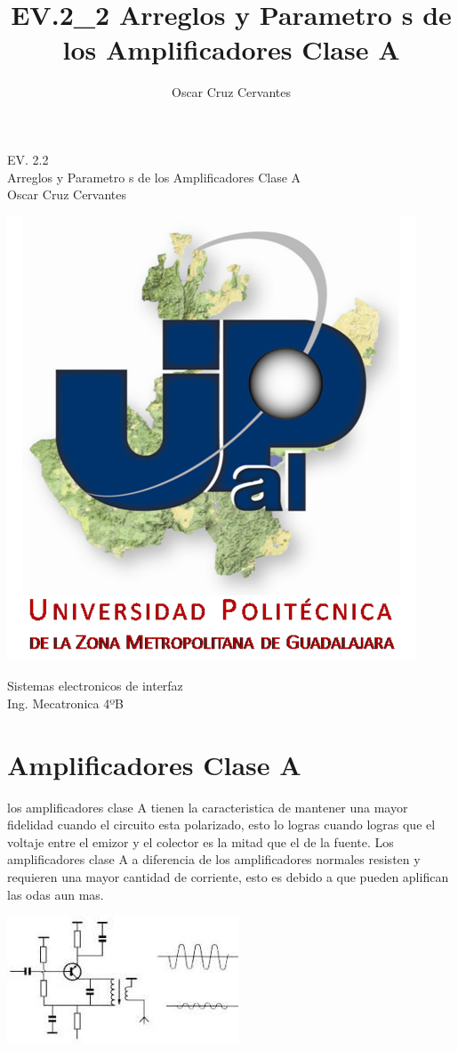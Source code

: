 \documentclass[12pt,a4paper]{report}
\author{Oscar Cruz Cervantes}
\title{EV.2_2 Arreglos y Parametro s de los Amplificadores Clase A}
\begin{document}
\begin{center}
EV. 2.2\\
Arreglos y Parametro s de los Amplificadores Clase A\\
Oscar Cruz Cervantes\\
\end{center}
\begin{center}
\includegraphics[scale=2]{01.png}
\end{center}
\begin{center}
Sistemas electronicos de interfaz\\
Ing. Mecatronica 4ºB
\end{center}
\newpage
\section{Amplificadores Clase A}
los amplificadores clase A tienen la caracteristica de mantener una mayor fidelidad cuando el circuito esta polarizado, esto lo logras cuando logras que el voltaje entre el emizor y el colector es la mitad que el de la fuente.
Los amplificadores clase A a diferencia de los amplificadores normales resisten y requieren una mayor cantidad de corriente, esto es debido a que pueden aplifican las odas aun mas.
\begin{center}
\includegraphics[scale=1.5]{02.jpg}
\end{center}
\end{document}
